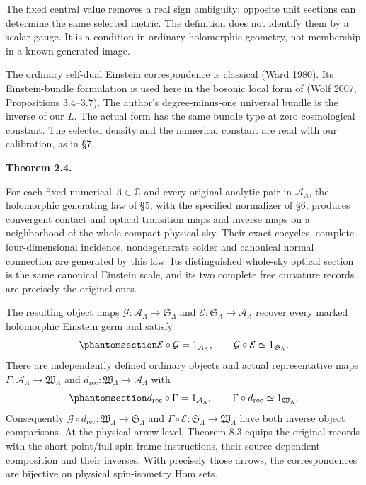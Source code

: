 \documentclass[
  english,
  11pt,
  reqno]{amsart}
\makeatletter
\newcommand{\pandocstatementheading}[1]{%
  \par\addpenalty{\@beginparpenalty}%
  \addvspace{.5\baselineskip plus .2\baselineskip minus .2\baselineskip}%
  {\normalfont\bfseries #1\par}%
  \nobreak\@afterindenttrue\@afterheading
}
\makeatother
\begin{document}
The fixed central value removes a real sign ambiguity: opposite unit
sections can determine the same selected metric. The definition does not
identify them by a scalar gauge. It is a condition in ordinary
holomorphic geometry, not membership in a known generated image.

The ordinary self-dual Einstein correspondence is classical (Ward 1980).
Its Einstein-bundle formulation is used here in the bosonic local form
of (Wolf 2007, Propositions 3.4--3.7). The author's degree-minus-one
universal bundle is the inverse of our \(L\). The actual form has the
same bundle type at zero cosmological constant. The selected density and
the numerical constant are read with our calibration, as in §7.

\pandocstatementheading{\protect{}\label{thm:gg-main}Theorem 2.4.}

For each fixed numerical \(\Lambda\in\mathbb C\) and every original
analytic pair in \(\mathcal A_\Lambda\), the holomorphic generating law
of §5, with the specified normalizer of §6, produces convergent contact
and optical transition maps and inverse maps on a neighborhood of the
whole compact physical sky. Their exact cocycles, complete
four-dimensional incidence, nondegenerate solder and canonical normal
connection are generated by this law. Its distinguished whole-sky
optical section is the same canonical Einstein scale, and its two
complete free curvature records are precisely the original ones.

The resulting object maps
\(\mathcal G:\mathcal A_\Lambda\to\mathfrak S_\Lambda\) and
\(\mathcal E:\mathfrak S_\Lambda\to\mathcal A_\Lambda\) recover every
marked holomorphic Einstein germ and satisfy
\begin{equation}\protect\phantomsection\label{eq:gg-main-generator-inverses}{
 \mathcal E\circ\mathcal G=1_{\mathcal A_\Lambda},\qquad
 \mathcal G\circ\mathcal E\simeq1_{\mathfrak S_\Lambda}.
}\end{equation} There are independently defined ordinary objects and
actual representative maps
\(\Gamma:\mathcal A_\Lambda\to\mathfrak W_\Lambda\) and
\(d_{\mathrm{rec}}:\mathfrak W_\Lambda\to\mathcal A_\Lambda\) with
\begin{equation}\protect\phantomsection\label{eq:gg-main-ordinary-inverses}{
 d_{\mathrm{rec}}\circ\Gamma=1_{\mathcal A_\Lambda},\qquad \Gamma\circ d_{\mathrm{rec}}\simeq1_{\mathfrak W_\Lambda}.
}\end{equation} Consequently
\(\mathcal G\circ d_{\mathrm{rec}}:\mathfrak W_\Lambda\to\mathfrak S_\Lambda\)
and \(\Gamma\circ\mathcal E:\mathfrak S_\Lambda\to\mathfrak W_\Lambda\)
have both inverse object comparisons. At the physical-arrow level,
Theorem 8.3 equips the original records with the short
point/full-spin-frame instructions, their source-dependent composition
and their inverses. With precisely those arrows, the correspondences are
bijective on physical spin-isometry Hom sets.
\end{document}
